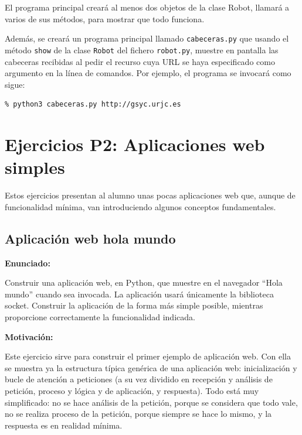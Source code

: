El programa principal creará al menos dos objetos de la clase Robot, llamará a varios de sus métodos, para mostrar que todo funciona.

Además, se creará un programa principal llamado \verb|cabeceras.py| que usando el método \verb|show| de la clase \verb|Robot| del fichero \verb|robot.py|, muestre en pantalla las cabeceras recibidas al pedir el recurso cuya URL se haya especificado como argumento en la línea de comandos. Por ejemplo, el programa se invocará como sigue:

\begin{verbatim}
% python3 cabeceras.py http://gsyc.urjc.es
\end{verbatim}

\newpage

\section{Ejercicios P2: Aplicaciones web simples}

Estos ejercicios presentan al alumno unas pocas aplicaciones web que, aunque de funcionalidad mínima, van introduciendo algunos conceptos fundamentales.

\subsection{Aplicación web hola mundo}
\label{subsec:aplweb-hola-mundo}

\textbf{Enunciado:}

Construir una aplicación web, en Python, que muestre en el navegador ``Hola mundo'' cuando sea invocada. La aplicación usará únicamente la biblioteca socket. Construir la aplicación de la forma más simple posible, mientras proporcione correctamente la funcionalidad indicada.

\textbf{Motivación:}

Este ejercicio sirve para construir el primer ejemplo de aplicación web. Con ella se muestra ya la estructura típica genérica de una aplicación web: inicialización y bucle de atención a peticiones (a su vez dividido en recepción y análisis de petición, proceso y lógica y de aplicación, y respuesta). Todo está muy simplificado: no se hace análisis de la petición, porque se considera que todo vale, no se realiza proceso de la petición, porque siempre se hace lo mismo, y la respuesta es en realidad mínima.

